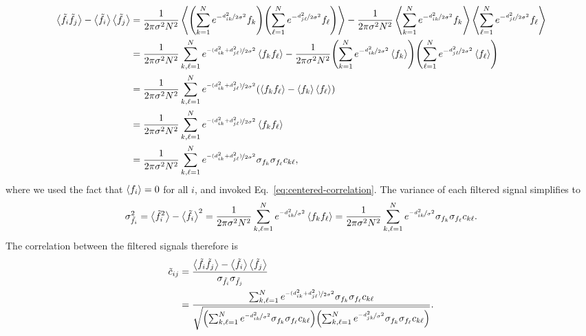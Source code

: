 \documentclass{article}
\begin{document}
\begin{align*}
    \expval{\Tilde{f}_i\Tilde{f}_j} - \expval{\Tilde{f}_i}\expval{\Tilde{f}_j}
    & = \frac{1}{2\pi\sigma^2N^2}\expval{\qty(\sum_{k=1}^N e^{-\nicefrac{d_{ik}^2}{2\sigma^2}}f_k)\qty(\sum_{\ell=1}^N e^{-\nicefrac{d_{j\ell}^2}{2\sigma^2}}f_\ell)}
      - \frac{1}{2\pi\sigma^2N^2}\expval{\sum_{k=1}^N e^{-\nicefrac{d_{ik}^2}{2\sigma^2}}f_k} \expval{\sum_{\ell=1}^N e^{-\nicefrac{d_{j\ell}^2}{2\sigma^2}}f_\ell} \\
    & = \frac{1}{2\pi\sigma^2N^2}\sum_{k, \ell =1}^N e^{\nicefrac{-(d_{ik}^2+d_{j\ell}^2)}{2\sigma^2}}\expval{f_kf_\ell}
      - \frac{1}{2\pi\sigma^2N^2}\qty(\sum_{k=1}^N e^{-\nicefrac{d_{ik}^2}{2\sigma^2}}\expval{f_k}) \qty(\sum_{\ell=1}^N e^{-\nicefrac{d_{j\ell}^2}{2\sigma^2}}\expval{f_\ell}) \\
    & = \frac{1}{2\pi\sigma^2N^2}\sum_{k, \ell =1}^N e^{\nicefrac{-(d_{ik}^2+d_{j\ell}^2)}{2\sigma^2}}\qty(\expval{f_kf_\ell} - \expval{f_k}\expval{f_\ell}) \\
    & = \frac{1}{2\pi\sigma^2N^2}\sum_{k, \ell =1}^N e^{\nicefrac{-(d_{ik}^2+d_{j\ell}^2)}{2\sigma^2}}\expval{f_kf_\ell} \\
    & = \frac{1}{2\pi\sigma^2N^2}\sum_{k, \ell =1}^N e^{\nicefrac{-(d_{ik}^2+d_{j\ell}^2)}{2\sigma^2}}\sigma_{f_k}\sigma_{f_\ell} c_{k\ell} ,
\end{align*}
where we used the fact that $\expval{f_i} = 0$ for all $i$, and invoked Eq.~\eqref{eq:centered-correlation}.
The variance of each filtered signal simplifies to
\begin{align*}
    \sigma^2_{\Tilde{f}_i}
      = \expval{\Tilde{f}_i^2} - \expval{\Tilde{f}_i}^2
      = \frac{1}{2\pi\sigma^2N^2}\sum_{k, \ell =1}^N e^{\nicefrac{-d_{ik}^2}{\sigma^2}}\expval{f_kf_\ell}
      = \frac{1}{2\pi\sigma^2N^2}\sum_{k, \ell =1}^N e^{\nicefrac{-d_{ik}^2}{\sigma^2}}\sigma_{f_k}\sigma_{f_\ell} c_{k\ell} .
\end{align*}
The correlation between the filtered signals therefore is
\begin{align*}
  \Tilde{c}_{ij}
    & = \frac{\expval{\Tilde{f}_i\Tilde{f}_j} - \expval{\Tilde{f}_i}\expval{\Tilde{f}_j}}{\sigma_{\Tilde{f}_i} \sigma_{\Tilde{f}_j}} \\
    & = \frac{\sum_{k, \ell =1}^N e^{\nicefrac{-(d_{ik}^2+d_{j\ell}^2)}{2\sigma^2}}\sigma_{f_k}\sigma_{f_\ell} c_{k\ell}}%
      {\sqrt{\qty(\sum_{k, \ell =1}^N e^{\nicefrac{-d_{ik}^2}{\sigma^2}}\sigma_{f_k}\sigma_{f_\ell} c_{k\ell}) \qty(\sum_{k, \ell =1}^N e^{\nicefrac{-d_{jk}^2}{\sigma^2}}\sigma_{f_k}\sigma_{f_\ell} c_{k\ell})}} .
\end{align*}
\end{document}
